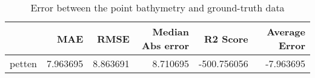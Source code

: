 \begin{table}[h!]
\caption{Error between the point bathymetry and ground-truth data}
\label{tab:petten_lidar_error}
\begin{tabular}{lrrrrr}
\toprule
 & MAE & RMSE & Median Abs error & R2 Score & Average Error \\
\midrule
petten & 7.963695 & 8.863691 & 8.710695 & -500.756056 & -7.963695 \\
\bottomrule
\end{tabular}
\end{table}
